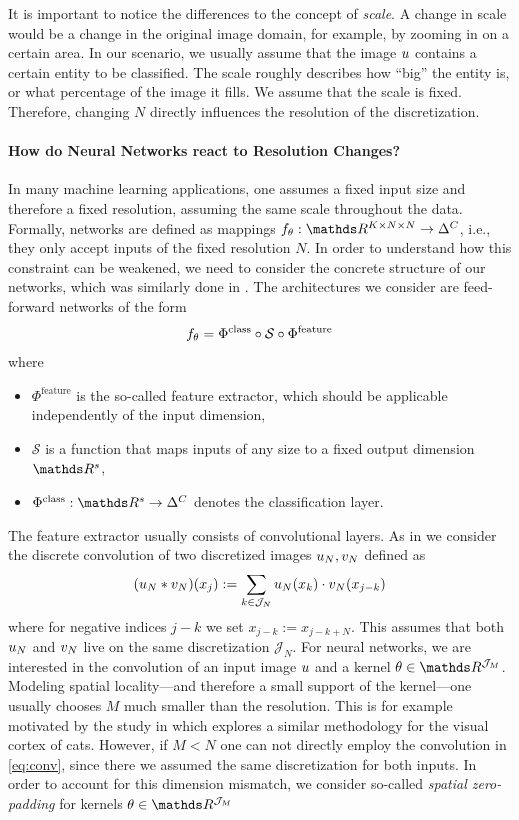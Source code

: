 It is important to notice the differences to the concept of \emph{scale}. A change in scale would be a change in the original image domain, for example, by zooming in on a certain area. In our scenario, we usually assume that the image $u$ contains a certain entity to be classified. The scale roughly describes how \enquote{big} the entity is, or what percentage of the image it fills. We assume that the scale is fixed. Therefore, changing $N$ directly influences the resolution of the discretization.

\paragraph{How do Neural Networks react to Resolution Changes?} In many machine learning applications, one assumes a fixed input size and therefore a fixed resolution, assuming the same scale throughout the data. Formally, networks are defined as mappings $\net_\param:\R^{K\times N\times N}\to\Delta^C$, i.e., they only accept inputs of the fixed resolution $N$. In order to understand how this constraint can be weakened, we need to consider the concrete structure of our networks, which was similarly done in \cite{kovachki2021universal, kabri2022FNO}. The architectures we consider are feed-forward networks of the form
%
\begin{align*}
f_\theta = \Phi^{\text{class}} \circ \mathcal{S}\circ \Phi^{\text{feature}}
\end{align*}
%
where 
%
\begin{itemize}
\item $\Phi^{\text{feature}}$ is the so-called feature extractor, which should be applicable independently of the input dimension,
\item $\mathcal{S}$ is a function that maps inputs of any size to a fixed output dimension $\R^s$,
\item $\Phi^{\text{class}}:\R^s\to\Delta^C$ denotes the classification layer.
\end{itemize}
%
%
%
The feature extractor usually consists of convolutional layers. As in \cite[Ch. 2]{kabri2022FNO} we consider the discrete convolution of two discretized images $u_N, v_N$ defined as 
%
\begin{align}\label{eq:conv}
(u_N\ast v_N)(x_j) := \sum_{k\in \mathcal{J}_N} u_N(x_k)\cdot v_N(x_{j-k})
\end{align}
%
where for negative indices $j-k$ we set $x_{j-k} := x_{j-k+N}$. This assumes that both $u_N$ and $v_N$ live on the same discretization $\mathcal{J}_N$. For neural networks, we are interested in the convolution of an input image $u$ and a kernel $\param\in\R^{\mathcal{J}_M}$. Modeling spatial locality---and therefore a small support of the kernel---one usually chooses $M$ much smaller than the resolution. This is for example motivated by the study in \cite{hubel1962receptive} which explores a similar methodology for the visual cortex of cats. However, if $M<N$ one can not directly employ the convolution in \cref{eq:conv}, since there we assumed the same discretization for both inputs. In order to account for this dimension mismatch, we consider so-called \emph{spatial zero-padding} for kernels $\param\in\R^{\mathcal{J}_M}$
